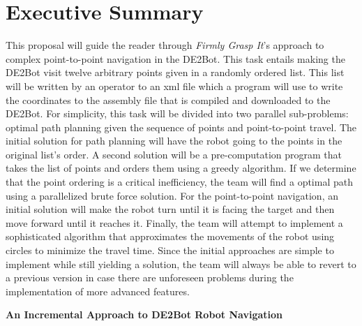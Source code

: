 \documentclass[11pt,conference,onecolumn]{article} %
\begin{document}
\section*{Executive Summary}
This proposal will guide the reader through \emph{Firmly Grasp It}'s approach to complex point-to-point navigation in the DE2Bot. This task entails making the DE2Bot visit twelve arbitrary points given in a randomly ordered list. This list will be written by an operator to an xml file which a program will use to write the coordinates to the assembly file that is compiled and downloaded to the DE2Bot. For simplicity, this task will be divided into two parallel sub-problems: optimal path planning given the sequence of points and point-to-point travel. The initial solution for path planning will have the robot going to the points in the original list's order. A second solution will be a pre-computation program that takes the list of points and orders them using a greedy algorithm. If we determine that the point ordering is a critical inefficiency, the team will find a optimal path using a parallelized brute force solution. For the point-to-point navigation, an initial solution will make the robot turn until it is facing the target and then move forward until it reaches it. Finally, the team will attempt to implement a sophisticated algorithm that approximates the movements of the robot using circles to minimize the travel time. Since the initial approaches are simple to implement while still yielding a solution, the team will always be able to revert to a previous version in case there are unforeseen problems during the implementation of more advanced features.


\clearpage

\begin{center}
  
   \textbf{\LARGE An Incremental Approach to DE2Bot Robot Navigation}
\end{center}
\end{document}
